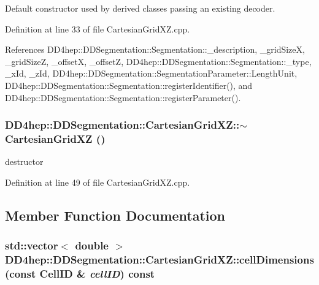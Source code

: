 Default constructor used by derived classes passing an existing decoder. 

Definition at line 33 of file CartesianGridXZ.cpp.

References DD4hep::DDSegmentation::Segmentation::\_\-description, \_\-gridSizeX, \_\-gridSizeZ, \_\-offsetX, \_\-offsetZ, DD4hep::DDSegmentation::Segmentation::\_\-type, \_\-xId, \_\-zId, DD4hep::DDSegmentation::SegmentationParameter::LengthUnit, DD4hep::DDSegmentation::Segmentation::registerIdentifier(), and DD4hep::DDSegmentation::Segmentation::registerParameter().\hypertarget{class_d_d4hep_1_1_d_d_segmentation_1_1_cartesian_grid_x_z_a2e43952843eb3f66c0ab65c779045b1f}{
\subsubsection[{$\sim$CartesianGridXZ}]{\setlength{\rightskip}{0pt plus 5cm}DD4hep::DDSegmentation::CartesianGridXZ::$\sim$CartesianGridXZ ()}}
\label{class_d_d4hep_1_1_d_d_segmentation_1_1_cartesian_grid_x_z_a2e43952843eb3f66c0ab65c779045b1f}


destructor 

Definition at line 49 of file CartesianGridXZ.cpp.

\subsection{Member Function Documentation}
\hypertarget{class_d_d4hep_1_1_d_d_segmentation_1_1_cartesian_grid_x_z_a83908aef5a6fff44c188ce6515a88856}{
\subsubsection[{cellDimensions}]{\setlength{\rightskip}{0pt plus 5cm}std::vector$<$ double $>$ DD4hep::DDSegmentation::CartesianGridXZ::cellDimensions (const {\bf CellID} \& {\em cellID}) const}}
\label{class_d_d4hep_1_1_d_d_segmentation_1_1_cartesian_grid_x_z_a83908aef5a6fff44c188ce6515a88856}


